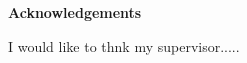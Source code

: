 
\mbox{}\newline\vspace{10mm} \mbox{}\LARGE
%
{\bf Acknowledgements} \normalsize \vspace{5mm}

I would like to thnk my supervisor.....